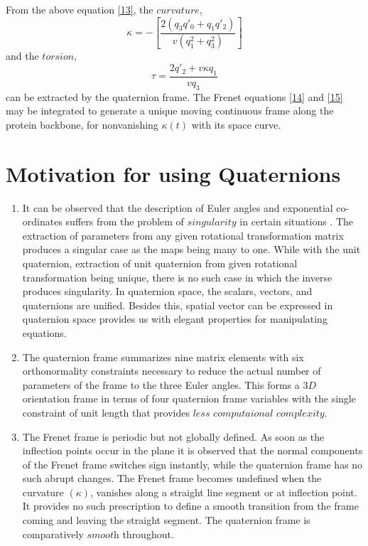 From the above equation \ref{13}, the $ curvature $,
\begin{equation}
\kappa = - \left[\dfrac{2(q_{3}q'_{0}+q_{1}q'_{2})}{v(q_{1}^{2}+q_{3}^{2})} \right]
\label{14} 
\end{equation}
and the $ torsion $,
\begin{equation}
\tau = \dfrac{2q'_{2}+v\kappa q_{1}}{vq_{3}}
\label{15}
\end{equation}
can be extracted by the quaternion frame. The Frenet equations \ref{14} and \ref{15} may be integrated to generate a unique moving continuous frame along the protein backbone, for nonvanishing $ \kappa (t) $ with its space curve.

\section*{Motivation for using Quaternions}

\begin{enumerate}
\item It can be observed that the description of Euler angles and exponential co-ordinates suffers from the problem of $ \textit{singularity} $ in certain situations \citep{Hanson}. The extraction of parameters from any given rotational transformation matrix produces a singular case as the maps being many to one. While with the unit quaternion, extraction of unit quaternion from given rotational transformation being unique, there is no such case in which the inverse produces singularity. In quaternion space, the scalars, vectors, and quaternions are unified. Besides this, spatial vector can be expressed in quaternion space provides us with elegant properties for manipulating equations.



\item The quaternion frame summarizes nine matrix elements with six orthonormality constraints necessary to reduce the actual number of parameters of the frame to the three Euler angles. This forms a $ 3D $ orientation frame in terms of four quaternion frame variables with the single constraint of unit length that provides $ \textit{less computaional complexity} $.



\item The Frenet frame is periodic but not globally defined. As soon as the inflection points \citep{shuangwei} occur in the plane it is observed that the normal components of the Frenet frame switches sign instantly, while the quaternion frame has no such abrupt changes. The Frenet frame becomes undefined when the curvature $ \left(\kappa\right) $, vanishes along a straight line segment or at inflection point. It provides no such prescription to define a smooth transition from the frame coming and leaving the straight segment. The quaternion frame is comparatively $ \textit{smooth} $ throughout.
\end{enumerate}















